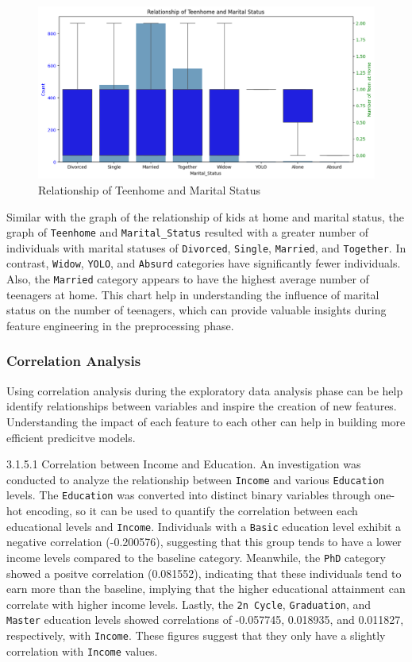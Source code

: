 \begin{figure}[H]
    \centering
    \includegraphics[width=\linewidth]{figures/teenhome_maritalstatus.png}
    \caption{Relationship of Teenhome and Marital Status}
\end{figure}

Similar with the graph of the relationship of kids at home and marital status, the graph of \texttt{Teenhome} and \texttt{Marital\_Status} resulted with a greater number of individuals with marital statuses of \texttt{Divorced}, \texttt{Single}, \texttt{Married}, and \texttt{Together}. In contrast, \texttt{Widow}, \texttt{YOLO}, and \texttt{Absurd} categories have significantly fewer individuals. Also, the \texttt{Married} category appears to have the highest average number of teenagers at home. This chart help in understanding the influence of marital status on the number of teenagers, which can provide valuable insights during feature engineering in the preprocessing phase.

\subsubsection{Correlation Analysis}

Using correlation analysis during the exploratory data analysis phase can be help identify relationships between variables and inspire the creation of new features. Understanding the impact of each feature to each other can help in building more efficient predicitve models.

    3.1.5.1 Correlation between Income and Education. An investigation was conducted to analyze the relationship between \texttt{Income} and various \texttt{Education} levels. The \texttt{Education} was converted into distinct binary variables through one-hot encoding, so it can be used to quantify the correlation between each educational levels and \texttt{Income}. Individuals with a \texttt{Basic} education level exhibit a negative correlation (-0.200576), suggesting that this group tends to have a lower income levels compared to the baseline category. Meanwhile, the \texttt{PhD} category showed a positve correlation (0.081552), indicating that these individuals tend to earn more than the baseline, implying that the higher educational attainment can correlate with higher income levels. Lastly, the \texttt{2n Cycle}, \texttt{Graduation}, and \texttt{Master} education levels showed correlations of -0.057745, 0.018935, and 0.011827, respectively, with \texttt{Income}. These figures suggest that they only have a slightly correlation with \texttt{Income} values.


